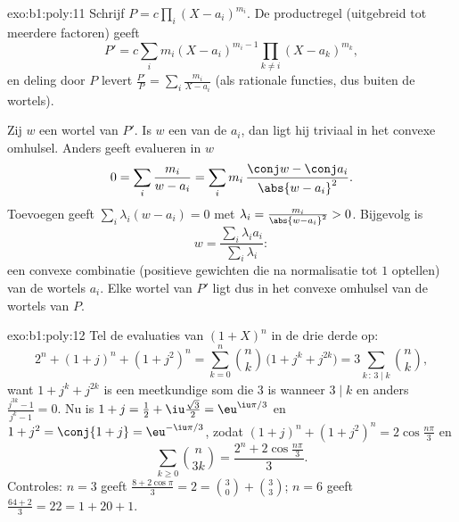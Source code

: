 \begin{solution}{exo:b1:poly:11}
Schrijf $P = c\prod_i (X - a_i)^{m_i}$. De productregel (uitgebreid tot
meerdere factoren) geeft
\[
P' = c\sum_{i} m_i (X - a_i)^{m_i - 1} \prod_{k \neq i} (X -
a_k)^{m_k},
\]
en deling door $P$ levert $\frac{P'}{P} = \sum_i \frac{m_i}{X - a_i}$
(als rationale functies, dus buiten de wortels).

Zij $w$ een wortel van $P'$. Is $w$ een van de $a_i$, dan ligt hij
triviaal in het convexe omhulsel. Anders geeft evalueren in $w$
\[
0 = \sum_i \frac{m_i}{w - a_i}
= \sum_i m_i\, \frac{\conj w - \conj a_i}{\abs{w - a_i}^2} .
\]
Toevoegen geeft $\sum_i \lambda_i (w - a_i) = 0$ met $\lambda_i =
\frac{m_i}{\abs{w - a_i}^2} > 0$. Bijgevolg is
\[
w = \frac{\sum_i \lambda_i a_i}{\sum_i \lambda_i} :
\]
een convexe combinatie (positieve gewichten die na normalisatie tot $1$
optellen) van de wortels $a_i$. Elke wortel van $P'$ ligt dus in het
convexe omhulsel van de wortels van $P$.
\end{solution}

\begin{solution}{exo:b1:poly:12}
Tel de evaluaties van $(1 + X)^n$ in de drie derde  op:
\[
2^n + (1 + j)^n + (1 + j^2)^n
= \sum_{k=0}^n \binom nk\,\bigl(1 + j^k + j^{2k}\bigr)
= 3\sum_{k\,:\,3\mid k}\binom nk ,
\]
want $1 + j^k + j^{2k}$ is een meetkundige som die $3$ is wanneer $3 \mid
k$ en anders $\frac{j^{3k} - 1}{j^k - 1} = 0$. Nu is $1 + j = \frac12 +
\iu\frac{\sqrt3}2 = \eu^{\iu\pi/3}$ en $1 + j^2 = \conj{1 + j} =
\eu^{-\iu\pi/3}$, zodat $(1+j)^n + (1+j^2)^n = 2\cos\frac{n\pi}3$ en
\[
\sum_{k\geq0}\binom n{3k} = \frac{2^n + 2\cos\frac{n\pi}3}{3} .
\]
Controles: $n = 3$ geeft $\frac{8 + 2\cos\pi}3 = 2 = \binom30 +
\binom33$; $n = 6$ geeft $\frac{64 + 2}3 = 22 = 1 + 20 + 1$.
\end{solution}

